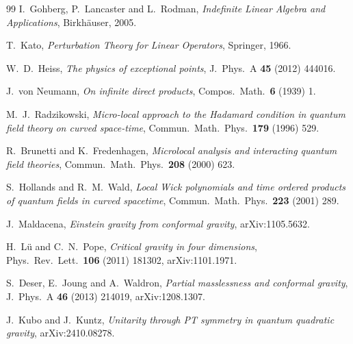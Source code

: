 \documentclass[11pt]{article}
\theoremstyle{remark}
\begin{document}
\begin{thebibliography}{99}
I.~Gohberg, P.~Lancaster and L.~Rodman,
\emph{Indefinite Linear Algebra and Applications},
Birkh\"auser, 2005.

T.~Kato,
\emph{Perturbation Theory for Linear Operators},
Springer, 1966.

W.~D.~Heiss,
\emph{The physics of exceptional points},
J.\ Phys.\ A \textbf{45} (2012) 444016.

J.~von Neumann,
\emph{On infinite direct products},
Compos.\ Math.\ \textbf{6} (1939) 1.

M.~J.~Radzikowski,
\emph{Micro-local approach to the Hadamard condition in quantum field
theory on curved space-time},
Commun.\ Math.\ Phys.\ \textbf{179} (1996) 529.

R.~Brunetti and K.~Fredenhagen,
\emph{Microlocal analysis and interacting quantum field theories},
Commun.\ Math.\ Phys.\ \textbf{208} (2000) 623.

S.~Hollands and R.~M.~Wald,
\emph{Local Wick polynomials and time ordered products of quantum fields
in curved spacetime},
Commun.\ Math.\ Phys.\ \textbf{223} (2001) 289.

J.~Maldacena,
\emph{Einstein gravity from conformal gravity},
arXiv:1105.5632.

H.~L\"u and C.~N.~Pope,
\emph{Critical gravity in four dimensions},
Phys.\ Rev.\ Lett.\ \textbf{106} (2011) 181302, arXiv:1101.1971.

S.~Deser, E.~Joung and A.~Waldron,
\emph{Partial masslessness and conformal gravity},
J.\ Phys.\ A \textbf{46} (2013) 214019, arXiv:1208.1307.

J.~Kubo and J.~Kuntz,
\emph{Unitarity through PT symmetry in quantum quadratic gravity},
arXiv:2410.08278.

\end{thebibliography}
\end{document}
